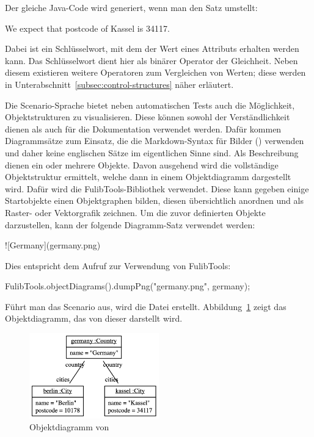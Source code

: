 Der gleiche Java-Code wird generiert, wenn man den Satz umstellt:

\begin{codeblock}
    We expect that postcode of Kassel is 34117.
\end{codeblock}

Dabei ist  ein Schlüsselwort, mit dem der Wert eines Attributs erhalten werden kann.
Das Schlüsselwort  dient hier als binärer Operator der Gleichheit.
Neben diesem existieren weitere Operatoren zum Vergleichen von Werten;
diese werden in Unterabschnitt~\ref{subsec:control-structures} näher erläutert.

Die Scenario-Sprache bietet neben automatischen Tests auch die Möglichkeit, Objektstrukturen zu visualisieren.
Diese können sowohl der Verständlichkeit dienen als auch für die Dokumentation verwendet werden.
Dafür kommen Diagrammsätze zum Einsatz, die die Markdown-Syntax für Bilder () verwenden und daher keine englischen Sätze im eigentlichen Sinne sind.
Als Beschreibung dienen ein oder mehrere Objekte.
Davon ausgehend wird die vollständige Objektstruktur ermittelt, welche dann in einem Objektdiagramm dargestellt wird.
Dafür wird die FulibTools\cite{fulibTools}-Bibliothek verwendet.
Diese kann gegeben einige Startobjekte einen Objektgraphen bilden, diesen übersichtlich anordnen und als Raster- oder Vektorgrafik zeichnen.
Um die zuvor definierten Objekte darzustellen, kann der folgende Diagramm-Satz verwendet werden:

\begin{mdcodeblock}
    ![Germany](germany.png)
\end{mdcodeblock}

Dies entspricht dem Aufruf zur Verwendung von FulibTools:

\begin{jcodeblock}
    FulibTools.objectDiagrams().dumpPng("germany.png", germany);
\end{jcodeblock}

Führt man das Scenario aus, wird die Datei  erstellt.
Abbildung~\ref{fig:germany.png} zeigt das Objektdiagramm, das von dieser darstellt wird.

\begin{figure}
    \centering
    \includegraphics[width=0.5\textwidth]{chapter/fulib-scenarios/img/germany.png}
    \caption{Objektdiagramm von }
    \label{fig:germany.png}
\end{figure}

